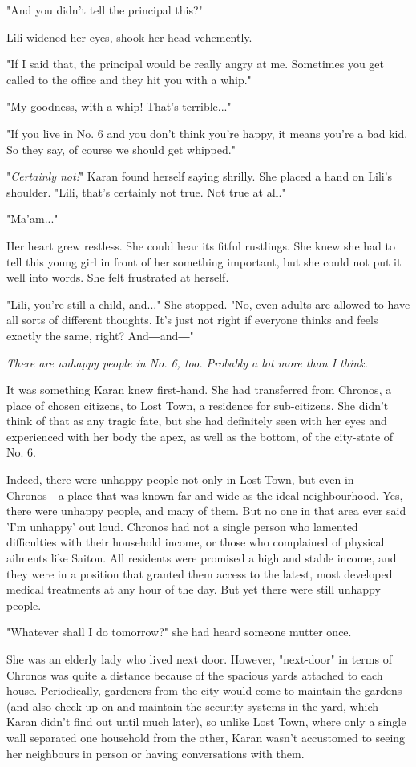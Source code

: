 "And you didn't tell the principal this?"

Lili widened her eyes, shook her head vehemently.

"If I said that, the principal would be really angry at me. Sometimes
you get called to the office and they hit you with a whip."

"My goodness, with a whip! That's terrible..."

"If you live in No. 6 and you don't think you're happy, it means you're
a bad kid. So they say, of course we should get whipped."

"\emph{Certainly not!}" Karan found herself saying shrilly. She placed a hand
on Lili's shoulder. "Lili, that's certainly not true. Not true at all."

"Ma'am..."

Her heart grew restless. She could hear its fitful rustlings. She knew
she had to tell this young girl in front of her something important, but
she could not put it well into words. She felt frustrated at herself.

"Lili, you're still a child, and..." She stopped. "No, even adults are
allowed to have all sorts of different thoughts. It's just not right if
everyone thinks and feels exactly the same, right? And―and―"

\emph{There are unhappy people in No. 6, too. Probably a lot more than I
think.}

It was something Karan knew first-hand. She had transferred from
Chronos, a place of chosen citizens, to Lost Town, a residence for
sub-citizens. She didn't think of that as any tragic fate, but she had
definitely seen with her eyes and experienced with her body the apex, as
well as the bottom, of the city-state of No. 6.

Indeed, there were unhappy people not only in Lost Town, but even in
Chronos―a place that was known far and wide as the ideal neighbourhood.
Yes, there were unhappy people, and many of them. But no one in that
area ever said 'I'm unhappy' out loud. Chronos had not a single person
who lamented difficulties with their household income, or those who
complained of physical ailments like Saiton. All residents were promised
a high and stable income, and they were in a position that granted them
access to the latest, most developed medical treatments at any hour of
the day. But yet there were still unhappy people.

"Whatever shall I do tomorrow?" she had heard someone mutter once.

She was an elderly lady who lived next door. However, "next-door" in
terms of Chronos was quite a distance because of the spacious yards
attached to each house. Periodically, gardeners from the city would come
to maintain the gardens (and also check up on and maintain the security
systems in the yard, which Karan didn't find out until much later), so
unlike Lost Town, where only a single wall separated one household from
the other, Karan wasn't accustomed to seeing her neighbours in person or
having conversations with them.

